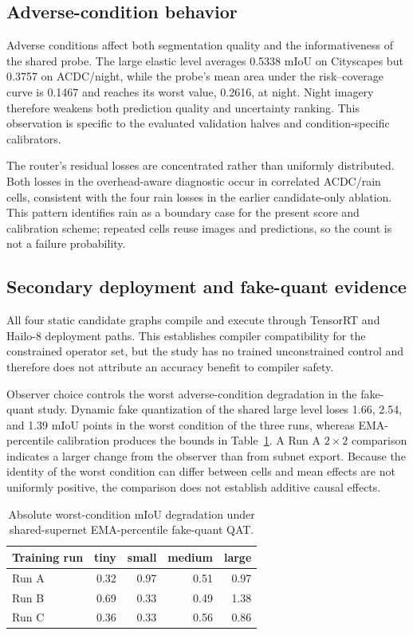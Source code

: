 \documentclass[a4paper,review,12pt]{elsarticle}
\newcommand{\miou}{mIoU}
\begin{document}
\subsection{Adverse-condition behavior}

Adverse conditions affect both segmentation quality and the informativeness of the shared probe. The large elastic level averages 0.5338 \miou{} on Cityscapes but 0.3757 on ACDC/night, while the probe's mean area under the risk--coverage curve is 0.1467 and reaches its worst value, 0.2616, at night. Night imagery therefore weakens both prediction quality and uncertainty ranking. This observation is specific to the evaluated validation halves and condition-specific calibrators.

The router's residual losses are concentrated rather than uniformly distributed. Both losses in the overhead-aware diagnostic occur in correlated ACDC/rain cells, consistent with the four rain losses in the earlier candidate-only ablation. This pattern identifies rain as a boundary case for the present score and calibration scheme; repeated cells reuse images and predictions, so the count is not a failure probability.

\subsection{Secondary deployment and fake-quant evidence}
\label{sec:qatresults}

All four static candidate graphs compile and execute through TensorRT and Hailo-8 deployment paths. This establishes compiler compatibility for the constrained operator set, but the study has no trained unconstrained control and therefore does not attribute an accuracy benefit to compiler safety.

Observer choice controls the worst adverse-condition degradation in the fake-quant study. Dynamic fake quantization of the shared large level loses 1.66, 2.54, and 1.39 \miou{} points in the worst condition of the three runs, whereas EMA-percentile calibration produces the bounds in Table~\ref{tab:qat}. A Run A $2\times2$ comparison indicates a larger change from the observer than from subnet export. Because the identity of the worst condition can differ between cells and mean effects are not uniformly positive, the comparison does not establish additive causal effects.

\begin{table}[H]
\centering
\caption{Absolute worst-condition \miou{} degradation under shared-supernet EMA-percentile fake-quant QAT.}
\label{tab:qat}
\begin{tabular}{@{}lrrrr@{}}
\toprule
Training run & tiny & small & medium & large \\
\midrule
Run A & 0.32 & 0.97 & 0.51 & 0.97 \\
Run B & 0.69 & 0.33 & 0.49 & 1.38 \\
Run C & 0.36 & 0.33 & 0.56 & 0.86 \\
\bottomrule
\end{tabular}
\end{table}
\end{document}
